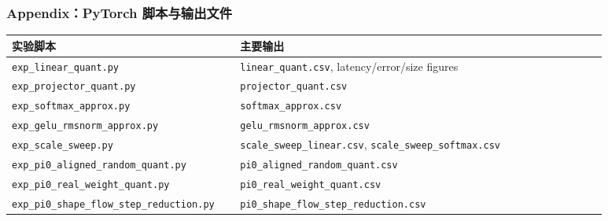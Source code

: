 \documentclass[10pt, aspectratio=169]{beamer}
\begin{document}
\begin{frame}
  \frametitle{Appendix：PyTorch 脚本与输出文件}
  \scriptsize
  \begin{table}
    \setlength{\tabcolsep}{2pt}
    \begin{tabular}{@{}p{0.30\linewidth}p{0.58\linewidth}@{}}
      \toprule
      实验脚本 & 主要输出 \\
      \midrule
      \texttt{exp\_linear\_quant.py} & \texttt{linear\_quant.csv}, latency/error/size figures \\
      \texttt{exp\_projector\_quant.py} & \texttt{projector\_quant.csv} \\
      \texttt{exp\_softmax\_approx.py} & \texttt{softmax\_approx.csv} \\
      \texttt{exp\_gelu\_rmsnorm\_approx.py} & \texttt{gelu\_rmsnorm\_approx.csv} \\
      \texttt{exp\_scale\_sweep.py} & \texttt{scale\_sweep\_linear.csv}, \texttt{scale\_sweep\_softmax.csv} \\
      \texttt{exp\_pi0\_aligned\_random\_quant.py} & \texttt{pi0\_aligned\_random\_quant.csv} \\
      \texttt{exp\_pi0\_real\_weight\_quant.py} & \texttt{pi0\_real\_weight\_quant.csv} \\
      \texttt{exp\_pi0\_shape\_flow\_step\_reduction.py} & \texttt{pi0\_shape\_flow\_step\_reduction.csv} \\
      \bottomrule
    \end{tabular}
  \end{table}
\end{frame}
\end{document}

